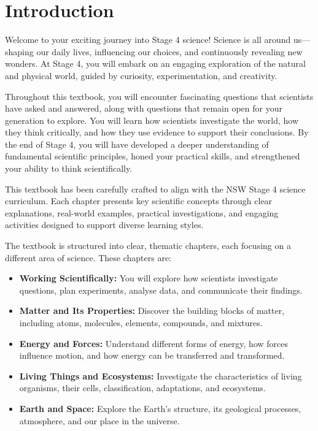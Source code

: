 \chapter{Introduction}

\FloatBarrier

Welcome to your exciting journey into Stage 4 science! Science is all around us—shaping our daily lives, influencing our choices, and continuously revealing new wonders. At Stage 4, you will embark on an engaging exploration of the natural and physical world, guided by curiosity, experimentation, and creativity. 

Throughout this textbook, you will encounter fascinating questions that scientists have asked and answered, along with questions that remain open for your generation to explore. You will learn how scientists investigate the world, how they think critically, and how they use evidence to support their conclusions. By the end of Stage 4, you will have developed a deeper understanding of fundamental scientific principles, honed your practical skills, and strengthened your ability to think scientifically.

\FloatBarrier

This textbook has been carefully crafted to align with the NSW Stage 4 science curriculum. Each chapter presents key scientific concepts through clear explanations, real-world examples, practical investigations, and engaging activities designed to support diverse learning styles.

The textbook is structured into clear, thematic chapters, each focusing on a different area of science. These chapters are:

\begin{itemize}
\item \textbf{Working Scientifically:} You will explore how scientists investigate questions, plan experiments, analyse data, and communicate their findings. 
\item \textbf{Matter and Its Properties:} Discover the building blocks of matter, including atoms, molecules, elements, compounds, and mixtures.
\item \textbf{Energy and Forces:} Understand different forms of energy, how forces influence motion, and how energy can be transferred and transformed.
\item \textbf{Living Things and Ecosystems:} Investigate the characteristics of living organisms, their cells, classification, adaptations, and ecosystems.
\item \textbf{Earth and Space:} Explore the Earth's structure, its geological processes, atmosphere, and our place in the universe.
\end{itemize}

